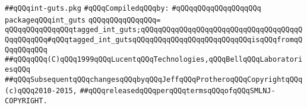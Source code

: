 \label{src/lib/std/src/int-guts.pkg}
\verb|##qQQqint-guts.pkg|\newline
\newline
\verb|#qQQqCompiledqQQqby:|\newline
\verb|#qQQqqQQqqQQqqQQqqQQq|\newline
\newline
\verb|packageqQQqint_guts|\newline
\verb|qQQqqQQqqQQqqQQq=|\newline
\verb|qQQqqQQqqQQqqQQqtagged_int_guts;qQQqqQQqqQQqqQQqqQQqqQQqqQQqqQQqqQQqqQQqqQQqqQQq#qQQqtagged_int_gutsqQQqqQQqqQQqqQQqqQQqqQQqqQQqisqQQqfromqQQqqQQqqQQq|\newline
\newline
\verb|##qQQqqQQq(C)qQQq1999qQQqLucentqQQqTechnologies,qQQqBellqQQqLaboratoriesqQQq|\newline
\verb|##qQQqSubsequentqQQqchangesqQQqbyqQQqJeffqQQqProtheroqQQqCopyrightqQQq(c)qQQq2010-2015,|\newline
\verb|##qQQqreleasedqQQqperqQQqtermsqQQqofqQQqSMLNJ-COPYRIGHT.|\newline

